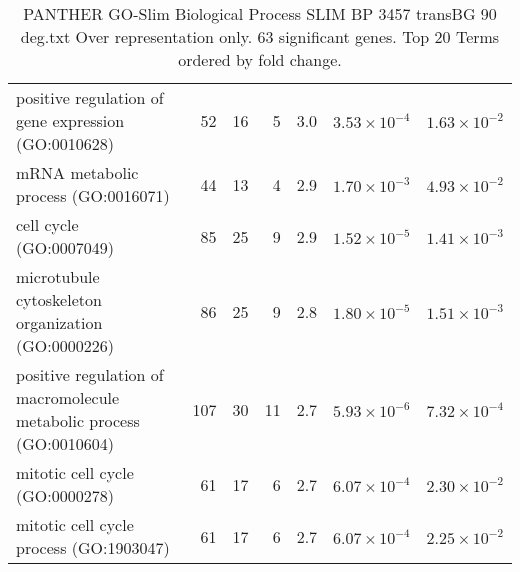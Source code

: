 \begin{table}[ht]
\begin{adjustbox}{width=\textwidth}
\begin{tabular}{lrrrrrr}
  positive regulation of gene expression (GO:0010628) & 52 & 16 & 5 & 3.0 & $3.53 \times 10^{-4}$ & $1.63 \times 10^{-2}$ \\ 
  mRNA metabolic process (GO:0016071) & 44 & 13 & 4 & 2.9 & $1.70 \times 10^{-3}$ & $4.93 \times 10^{-2}$ \\ 
  cell cycle (GO:0007049) & 85 & 25 & 9 & 2.9 & $1.52 \times 10^{-5}$ & $1.41 \times 10^{-3}$ \\ 
  microtubule cytoskeleton organization (GO:0000226) & 86 & 25 & 9 & 2.8 & $1.80 \times 10^{-5}$ & $1.51 \times 10^{-3}$ \\ 
  positive regulation of macromolecule metabolic process (GO:0010604) & 107 & 30 & 11 & 2.7 & $5.93 \times 10^{-6}$ & $7.32 \times 10^{-4}$ \\ 
  mitotic cell cycle (GO:0000278) & 61 & 17 & 6 & 2.7 & $6.07 \times 10^{-4}$ & $2.30 \times 10^{-2}$ \\ 
  mitotic cell cycle process (GO:1903047) & 61 & 17 & 6 & 2.7 & $6.07 \times 10^{-4}$ & $2.25 \times 10^{-2}$ \\ 
   \hline
\end{tabular}
\end{adjustbox}
\caption{PANTHER GO-Slim Biological Process SLIM BP 3457 transBG 90 deg.txt Over representation only. 63 significant genes. Top 20 Terms ordered by fold change. } 
\label{tab:PANTHER GO-Slim Biological Process SLIM BP 3457 transBG 90 deg.txt Over representation only. 63 significant genes. Top 20 Terms ordered by fold change. }
\end{table}


